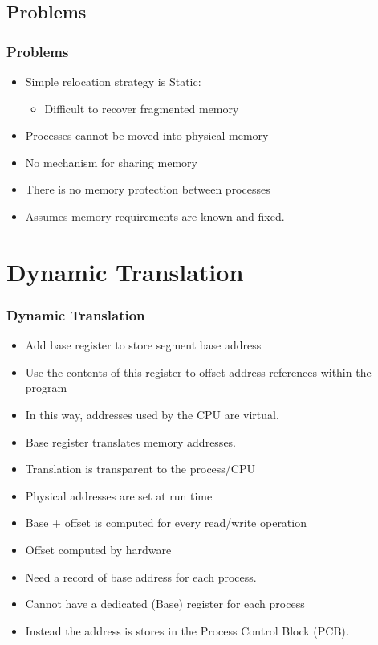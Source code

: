 \documentclass{beamer}
\begin{document}
\subsection{Problems}
\begin{frame}
\frametitle{Problems}
\begin{itemize}
\item Simple relocation strategy is Static:
\begin{itemize}
\item Difficult to recover fragmented memory
\end{itemize}
\item Processes cannot be moved into physical memory
\item No mechanism for sharing memory
\item There is no memory protection between processes
\item Assumes memory requirements are known and fixed.
\end{itemize}
\end{frame}
\section{Dynamic Translation}
\begin{frame}
\frametitle{Dynamic Translation}
\begin{itemize}
\item Add base register to store segment base address
\item Use the contents of this register to offset address references within the program
\item In this way, addresses used by the CPU are virtual.
\item Base register translates memory addresses.
\item Translation is transparent to the process/CPU
\item Physical addresses are set at run time
\item Base + offset is computed for every read/write operation
\item Offset computed by hardware
\item Need a record of base address for each process.
\item Cannot have a dedicated (Base) register for each process
\item Instead the address is stores in the Process Control Block (PCB).
\end{itemize}
\end{frame}
\end{document}
